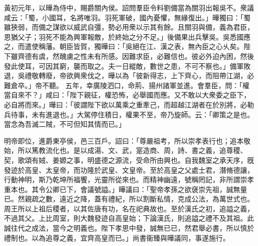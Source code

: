 \begin{pinyinscope}
 
黃初元年，以曄為侍中，賜爵關內侯。詔問羣臣令料劉備當為關羽出報吳不。衆議咸云：「蜀，小國耳，名將唯羽。羽死軍破，國內憂懼，無緣復出。」曄獨曰：「蜀雖狹弱，而備之謀欲以威武自彊，勢必用衆以示其有餘。且關羽與備，義為君臣，恩猶父子；羽死不能為興軍報敵，於終始之分不足。」後備果出兵擊吳。吳悉國應之，而遣使稱藩。朝臣皆賀，獨曄曰：「吳絕在江、漢之表，無內臣之心乆矣。陛下雖齊德有虞，然醜虜之性未有所感。因難求臣，必難信也。彼必外迫內困，然後發此使耳，可因其窮，襲而取之。夫一日縱敵，數世之患，不可不察也。」備軍敗退，吳禮敬轉廢，帝欲興衆伐之，曄以為「彼新得志，上下齊心，而阻帶江湖，必難倉卒。」帝不聽。
 五年，幸廣陵泗口，命荊、揚州諸軍並進。會羣臣，問：「權當自來不？」咸曰：「陛下親征，權恐怖，必舉國而應。又不敢以大衆委之臣下，必自將而來。」曄曰：「彼謂陛下欲以萬乘之重牽己，而超越江湖者在於別將，必勒兵待事，未有進退也。」大駕停住積日，權果不至，帝乃旋師。云：「卿策之是也。當念為吾滅二賊，不可但知其情而已。」
 
 
 
 
 明帝即位，進爵東亭侯，邑三百戶。詔曰：「尊嚴祖考，所以崇孝表行也；追本敬始，所以篤教流化也。是以成湯、文、武，寔造商、周，詩、書之義，追尊稷、契，歌頌有娀、姜嫄之事，明盛德之源流，受命所由興也。自我魏室之承天序，旣發迹於高皇、太皇帝，而功隆於武皇、文皇帝。至於高皇之父處士君，潛脩德讓，行動神明，斯乃乾坤所福饗，光靈所從來也。而精神幽遠，號稱罔記，非所謂崇孝重本也。其令公卿已下，會議號謚。」曄議曰：「聖帝孝孫之欲襃崇先祖，誠無量已。然親疏之數，遠近之降，蓋有禮紀，所以割斷私情，克成公法，為萬世式也。周王所以上祖后稷者，以其佐唐有功，名在祀典故也。至於漢氏之初，追謚之義，不過其父。上比周室，則大魏發迹自高皇始；下論漢氏，則追謚之禮不及其祖。此誠往代之成法，當今之明義也。陛下孝思中發，誠無已已，然君舉必書，所以慎於禮制也。以為追尊之義，宜齊高皇而已。」尚書衞臻與曄議同，事遂施行。
 

\end{pinyinscope}
